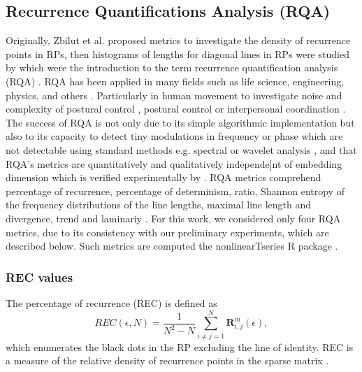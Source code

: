 \documentclass[fleqn,10pt]{wlscirep}
\begin{document}
\subsection*{Recurrence Quantifications Analysis (RQA)}
Originally, Zbilut et al. \cite{zbilut1992} proposed metrics to investigate 
the density of recurrence points in RPs, then histograms of lengths for 
diagonal lines in RPs were studied by \cite{trulla1996} which were the 
introduction to the term recurrence quantification analysis (RQA) 
\cite{marwan2008}. RQA has been applied in many fields such as life science, 
engineering, physics, and others \cite{marwan2008}. Particularly in human 
movement to investigate noise and complexity of postural control 
\cite{rhea2011}, postural control \cite{apthorp2014} or interpersonal 
coordination \cite{duran2017}. The success of RQA is not only due to its 
simple algorithmic implementation but also to its capacity to detect tiny 
modulations in frequency or phase which are not detectable using standard 
methods e.g. spectral or wavelet analysis \cite{marwan2011}, and that 
RQA's metrics are quantitatively and qualitatively independe]nt of embedding 
dimension which is verified experimentally by \cite{iwanski1998}.
RQA metrics comprehend percentage of recurrence, percentage of determinism, 
ratio, Shannon entropy of the frequency distributions of the line lengths,
maximal line length and divergence, trend and laminariy 
\cite{marwan2007, marwan2015}. For this work, we considered only four 
RQA metrics, due to its consistency with our preliminary experiments, 
which are described below. Such metrics are computed the nonlinearTseries 
R package \cite{nonlinearTseries2016}.

\subsubsection*{REC values}
The percentage of recurrence (REC) is defined as
\begin{equation}
REC(\epsilon,N) = 
		\frac{1}{N^2 - N} \sum^{N}_{i \neq j = 1} 
		\mathbf{R}^{m}_{i,j}(\epsilon),
\end{equation}
which enumerates the black dots in the RP excluding the line of identity.
REC is a measure of the relative density of recurrence points in the sparse 
matrix \cite{marwan2015}.
\end{document}
